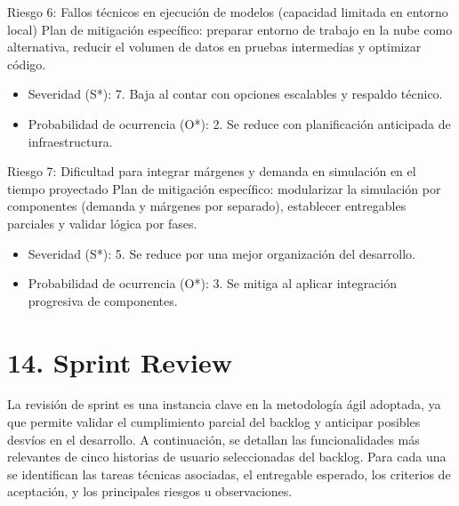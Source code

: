 \documentclass[
11pt, %
]{charter}
\begin{document}
Riesgo 6: Fallos técnicos en ejecución de modelos (capacidad limitada en entorno local)
Plan de mitigación específico: preparar entorno de trabajo en la nube como alternativa, reducir el volumen de datos en pruebas intermedias y optimizar código.
\begin{itemize}
	\item Severidad (S*): 7. Baja al contar con opciones escalables y respaldo técnico.
	\item Probabilidad de ocurrencia (O*): 2. Se reduce con planificación anticipada de infraestructura.
\end{itemize}

Riesgo 7: Dificultad para integrar márgenes y demanda en simulación en el tiempo proyectado
Plan de mitigación específico: modularizar la simulación por componentes (demanda y márgenes por separado), establecer entregables parciales y validar lógica por fases.
\begin{itemize}
	\item Severidad (S*): 5. Se reduce por una mejor organización del desarrollo.
	\item Probabilidad de ocurrencia (O*): 3. Se mitiga al aplicar integración progresiva de componentes.
\end{itemize}

\newpage

\section{14. Sprint Review}
\label{sec:sprint_review}

La revisión de sprint es una instancia clave en la metodología ágil adoptada, ya que permite validar el cumplimiento parcial del backlog y anticipar posibles desvíos en el desarrollo. A continuación, se detallan las funcionalidades más relevantes de cinco historias de usuario seleccionadas del backlog. Para cada una se identifican las tareas técnicas asociadas, el entregable esperado, los criterios de aceptación, y los principales riesgos u observaciones.
\end{document}

